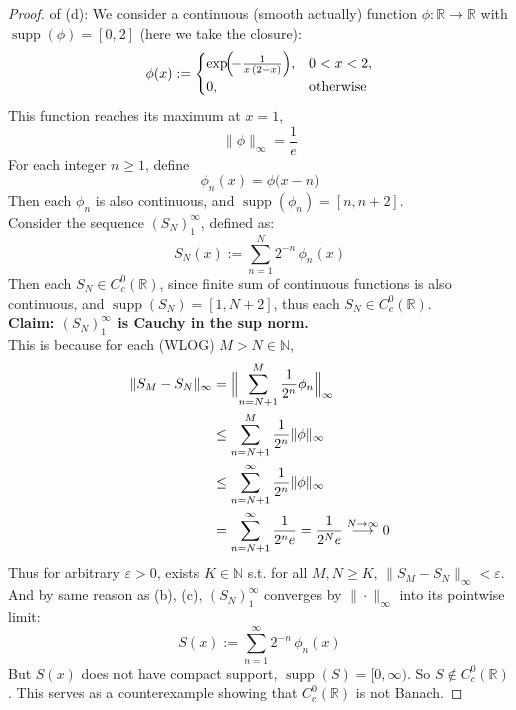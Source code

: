 \documentclass[lang=cn,11pt]{elegantbook}
\begin{document}
\begin{proof}
    of (d): 
We consider a continuous (smooth actually) function \(\phi : \mathbb{R} \to \mathbb{R}\) with \(\operatorname{supp}(\phi) =  [0,2]\) (here we take the closure):\[
\phi(x)
:=\begin{cases}
\exp\!\Bigl(\!-\frac{1}{x\,(2 - x)}\Bigr), 
& 0 < x < 2,\\
0, & \text{otherwise}
\end{cases}
\]
This function reaches its maximum at $x = 1$, \[
\|\phi \|_\infty = \frac{1}{e}
\]
For each integer \(n \ge 1\), define \[
   \phi_n(x) = \phi\!\bigl(x - n\bigr)
\]
Then each \(\phi_n\) is also continuous, and \(\operatorname{supp}(\phi_n) =[n,n+2]\).\\
Consider  the sequence $(S_N)_1^\infty$, defined as: \[
   S_N(x) := \sum_{n=1}^{N} 2^{-n}\,\phi_n(x)
\]
Then each \(S_N \in C^0_c(\mathbb{R})\), since finite sum of continuous functions is also continuous, and $\operatorname{supp} (S_N) = [1,N+2]$, thus each $S_N \in C^0_c(\mathbb{R})$.\\
\textbf{Claim: $(S_N)_1^\infty$ is Cauchy in the sup norm.}\\
This is because for each (WLOG)  \(M > N\in \mathbb{N} \),  \begin{align*}
      \|S_M - S_N\|_{\infty}  &= 
    \Bigl\|\sum_{n=N+1}^{M} \frac{1}{2^n}\phi_n\Bigr\|_{\infty} \\ &\leq  
    \sum_{n=N+1}^{M} \frac{1}{2^n} \|\phi\|_{\infty} \\&\leq  
    \sum_{n=N+1}^{\infty} \frac{1}{2^n} \|\phi\|_{\infty}\\& =  \sum_{n=N+1}^{\infty} \frac{1}{2^n e}  = \frac{1}{2^N e} \overset{N\to \infty}{\longrightarrow} 0
\end{align*}
Thus for arbitrary $\varepsilon >0$, exists $K\in\mathbb{N}$ s.t. for all $M,N \geq K$, $  \|S_M - S_N\|_{\infty}  < \varepsilon$. And by same reason as (b), (c), $(S_N)_1^\infty$ converges by $\| \cdot \|_\infty$ into its pointwise limit: \[
  S(x) := \sum_{n=1}^{\infty} 2^{-n}\,\phi_n(x)
\]
But $S(x)$ does not have compact support, $\operatorname{supp}(S) = [0,\infty)$. So \(   S \notin C^0_c(\mathbb{R})\). This serves as a counterexample showing that \(C^0_c(\mathbb{R})\) is not Banach.
\end{proof}
\end{document}
